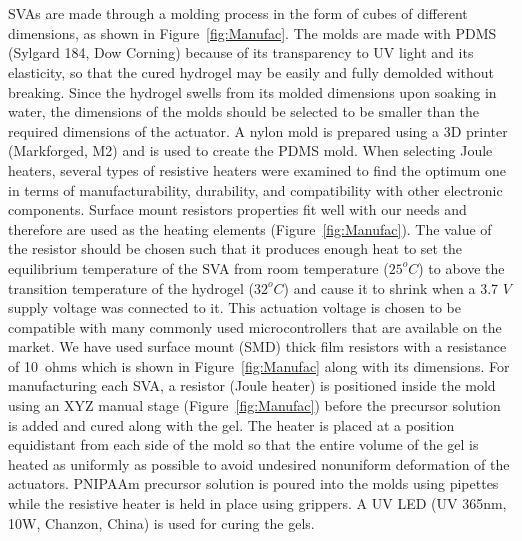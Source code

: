 \section{}
SVAs are made through a molding process in the form of cubes of different dimensions, as shown in Figure~\ref{fig:Manufac}. The molds are made with PDMS (Sylgard 184, Dow Corning) because of its transparency to UV light and its elasticity, so that the cured hydrogel may be easily and fully demolded without breaking. Since the hydrogel swells from its molded dimensions upon soaking in water, the dimensions of the molds should be selected to be smaller than the required dimensions of the actuator. A nylon mold is prepared using a 3D printer (Markforged, M2) and is used to create the PDMS mold. When selecting Joule heaters, several types of resistive heaters were examined to find the optimum one in terms of manufacturability, durability, and compatibility with other electronic components. Surface mount resistors properties fit well with our needs and therefore are used as the heating elements (Figure~\ref{fig:Manufac}). The value of the resistor should be chosen such that it produces enough heat to set the equilibrium temperature of the SVA from room temperature ($25^{o}C$) to above the transition temperature of the hydrogel ($32^{o}C$) and cause it to shrink when a 3.7 $V$ supply voltage was connected to it. This actuation voltage is chosen to be compatible with many commonly used microcontrollers that are available on the market. We have used surface mount (SMD) thick film resistors with a resistance of 10~ohms which is shown in Figure~\ref{fig:Manufac} along with its dimensions. For manufacturing each SVA, a resistor (Joule heater) is positioned inside the mold using an XYZ manual stage (Figure~\ref{fig:Manufac}) before the precursor solution is added and cured along with the gel. The heater is placed at a position equidistant from each side of the mold so that the entire volume of the gel is heated as uniformly as possible to avoid undesired nonuniform deformation of the actuators. PNIPAAm precursor solution is poured into the molds using pipettes while the resistive heater is held in place using grippers. A UV LED (UV 365nm, 10W, Chanzon, China) is used for curing the gels. 

